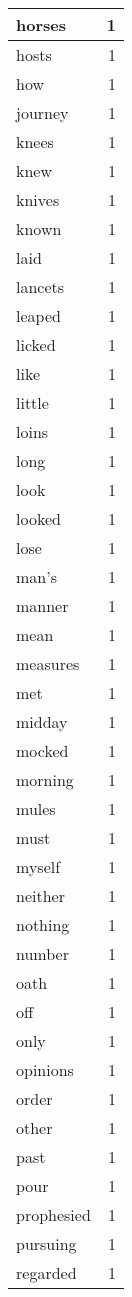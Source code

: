 \begin{center}
\begin{longtable}{l|r}
horses & 1 \\ \hline
hosts & 1 \\ \hline
how & 1 \\ \hline
journey & 1 \\ \hline
knees & 1 \\ \hline
knew & 1 \\ \hline
knives & 1 \\ \hline
known & 1 \\ \hline
laid & 1 \\ \hline
lancets & 1 \\ \hline
leaped & 1 \\ \hline
licked & 1 \\ \hline
like & 1 \\ \hline
little & 1 \\ \hline
loins & 1 \\ \hline
long & 1 \\ \hline
look & 1 \\ \hline
looked & 1 \\ \hline
lose & 1 \\ \hline
man's & 1 \\ \hline
manner & 1 \\ \hline
mean & 1 \\ \hline
measures & 1 \\ \hline
met & 1 \\ \hline
midday & 1 \\ \hline
mocked & 1 \\ \hline
morning & 1 \\ \hline
mules & 1 \\ \hline
must & 1 \\ \hline
myself & 1 \\ \hline
neither & 1 \\ \hline
nothing & 1 \\ \hline
number & 1 \\ \hline
oath & 1 \\ \hline
off & 1 \\ \hline
only & 1 \\ \hline
opinions & 1 \\ \hline
order & 1 \\ \hline
other & 1 \\ \hline
past & 1 \\ \hline
pour & 1 \\ \hline
prophesied & 1 \\ \hline
pursuing & 1 \\ \hline
regarded & 1 \\ \hline

\end{longtable}
\end{center}
